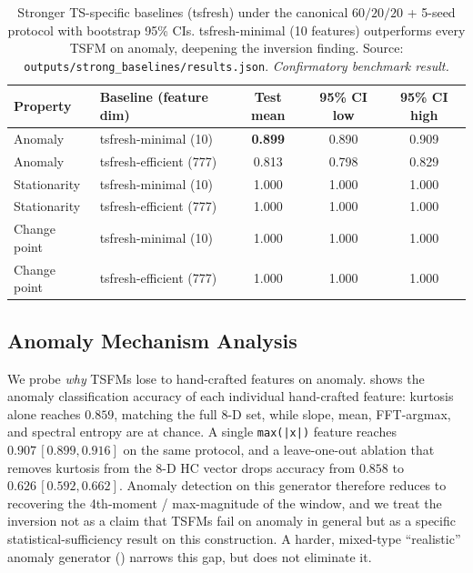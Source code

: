 \documentclass{article}
\begin{document}
\begin{table}[htbp]
\caption{Stronger TS-specific baselines (tsfresh) under the canonical $60/20/20$ + 5-seed protocol with bootstrap 95\% CIs. tsfresh-minimal (10 features) outperforms every TSFM on anomaly, deepening the inversion finding. Source: \texttt{outputs/strong\_baselines/results.json}. \emph{Confirmatory benchmark result.}}
\label{tab:strong_baselines}
\centering
\small
\begin{tabular}{llccc}
\toprule
Property & Baseline (feature dim) & Test mean & 95\% CI low & 95\% CI high \\
\midrule
Anomaly      & tsfresh-minimal (10)   & \textbf{0.899} & 0.890 & 0.909 \\
Anomaly      & tsfresh-efficient (777) & 0.813 & 0.798 & 0.829 \\
Stationarity & tsfresh-minimal (10)   & 1.000 & 1.000 & 1.000 \\
Stationarity & tsfresh-efficient (777) & 1.000 & 1.000 & 1.000 \\
Change point & tsfresh-minimal (10)   & 1.000 & 1.000 & 1.000 \\
Change point & tsfresh-efficient (777) & 1.000 & 1.000 & 1.000 \\
\bottomrule
\end{tabular}
\end{table}

\subsection{Anomaly Mechanism Analysis}
\label{sec:anomaly_mechanism}
\label{sec:appendix_per_feature}

We probe \emph{why} TSFMs lose to hand-crafted features on anomaly.  shows the anomaly classification accuracy of each individual hand-crafted feature: kurtosis alone reaches $0.859$, matching the full 8-D set, while slope, mean, FFT-argmax, and spectral entropy are at chance. A single \texttt{max(|x|)} feature reaches $0.907\,[0.899,0.916]$ on the same protocol, and a leave-one-out ablation that removes kurtosis from the 8-D HC vector drops accuracy from $0.858$ to $0.626\,[0.592,0.662]$. Anomaly detection on this generator therefore reduces to recovering the 4th-moment / max-magnitude of the window, and we treat the inversion not as a claim that TSFMs fail on anomaly in general but as a specific statistical-sufficiency result on this construction. A harder, mixed-type ``realistic'' anomaly generator () narrows this gap, but does not eliminate it.
\end{document}
